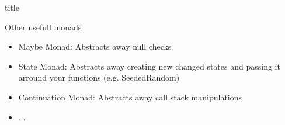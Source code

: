 \begin{frame}[t]{title}
    \begin{block}{Other usefull monads}
        \begin{itemize}
            \item Maybe Monad: Abstracts away null checks
            \item State Monad: Abstracts away creating new changed states and passing it arround your functions (e.g.  SeededRandom)
            \item Continuation Monad: Abstracts away call stack manipulations
            \item ...
        \end{itemize}
    \end{block}
\end{frame}
